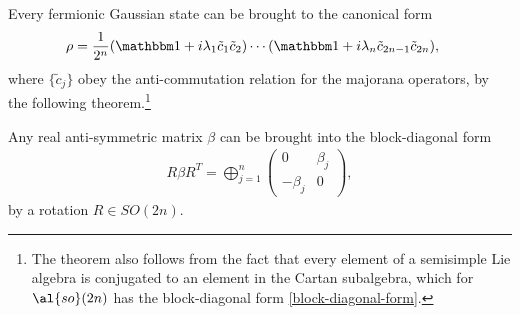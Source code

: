 Every fermionic Gaussian state can be brought to the canonical form
\begin{align}
	\rho &= \frac{1}{2^n} (\id + i\lambda_1 \tilde{c}_1 \tilde{c}_2) \cdots (\id + i\lambda_{n} \tilde{c}_{2n-1} \tilde{c}_{2n}),
\end{align}
where $\{ \tilde{c}_j \}$ obey the anti-commutation relation for the majorana operators, by the following theorem.\footnote{The theorem also follows from the fact that every element of a semisimple Lie algebra is conjugated to an element in the Cartan subalgebra, which for $\al{so}(2n)$ has the block-diagonal form \eqref{block-diagonal-form}.}

\begin{theorem}
Any real anti-symmetric matrix $\beta$ can be brought into the block-diagonal form
\begin{align}\label{block-diagonal-form}
R\beta R^T = \bigoplus_{j=1}^n \left( \begin{array}{cc} 0 & \beta_j \\ -\beta_j & 0 \end{array} \right),
\end{align}
by a rotation $R \in SO(2n)$.
\end{theorem}
